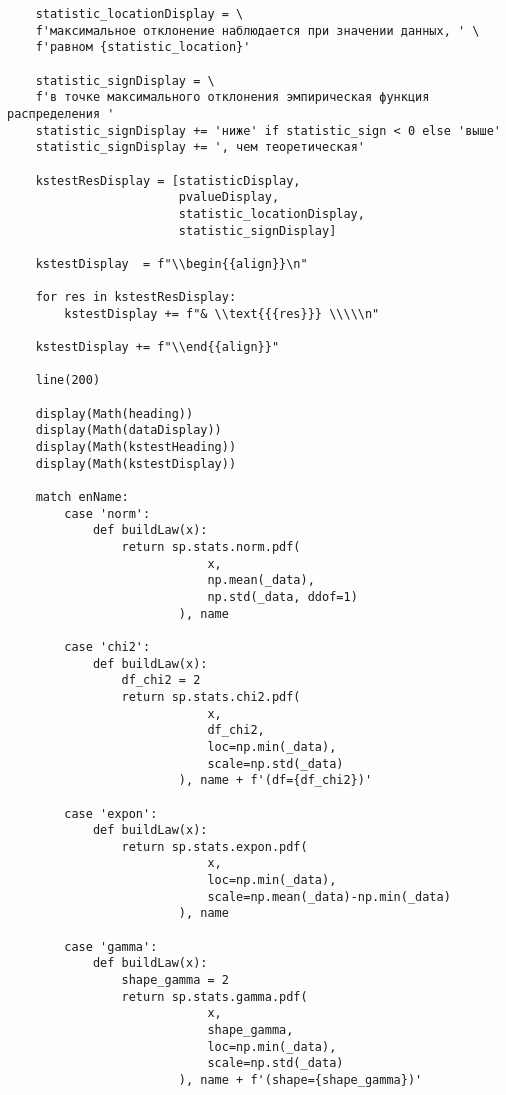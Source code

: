 \documentclass[a4paper, 14pt]{extarticle}
\begin{document}
\begin{lstlisting}
    statistic_locationDisplay = \
    f'максимальное отклонение наблюдается при значении данных, ' \
    f'равном {statistic_location}'

    statistic_signDisplay = \
    f'в точке максимального отклонения эмпирическая функция распределения '
    statistic_signDisplay += 'ниже' if statistic_sign < 0 else 'выше'
    statistic_signDisplay += ', чем теоретическая'

    kstestResDisplay = [statisticDisplay, 
                        pvalueDisplay, 
                        statistic_locationDisplay, 
                        statistic_signDisplay]

    kstestDisplay  = f"\\begin{{align}}\n" 

    for res in kstestResDisplay:
        kstestDisplay += f"& \\text{{{res}}} \\\\\n"

    kstestDisplay += f"\\end{{align}}" 

    line(200)

    display(Math(heading))
    display(Math(dataDisplay))
    display(Math(kstestHeading))
    display(Math(kstestDisplay))

    match enName:
        case 'norm': 
            def buildLaw(x):
                return sp.stats.norm.pdf(
                            x, 
                            np.mean(_data), 
                            np.std(_data, ddof=1)
                        ), name

        case 'chi2': 
            def buildLaw(x):
                df_chi2 = 2
                return sp.stats.chi2.pdf(
                            x, 
                            df_chi2, 
                            loc=np.min(_data), 
                            scale=np.std(_data)
                        ), name + f'(df={df_chi2})'

        case 'expon': 
            def buildLaw(x):
                return sp.stats.expon.pdf(
                            x, 
                            loc=np.min(_data), 
                            scale=np.mean(_data)-np.min(_data)
                        ), name

        case 'gamma': 
            def buildLaw(x):
                shape_gamma = 2
                return sp.stats.gamma.pdf(
                            x, 
                            shape_gamma, 
                            loc=np.min(_data), 
                            scale=np.std(_data)
                        ), name + f'(shape={shape_gamma})'
            

\end{lstlisting}
\end{document}
